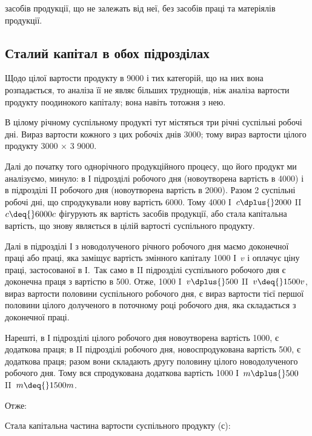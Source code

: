 \parcont{}  %
засобів продукції, що не залежать від неї, без засобів праці та матеріялів
продукції.

\subsection{Сталий капітал в обох підрозділах}

Щодо цілої вартости продукту в 9000 і тих категорій, що на них
вона розпадається, то аналіза її не являє більших труднощів, ніж аналіза
вартости продукту поодинокого капіталу; вона навіть тотожня з нею.

В цілому річному суспільному продукті тут містяться три річні суспільні
робочі дні. Вираз вартости кожного з цих робочіх днів \deq{} 3000; тому
вираз вартости цілого продукту 3000 × 3 \deq{} 9000.

Далі до початку того однорічного продукційного процесу, що його
продукт ми аналізуємо, минуло: в І підрозділі  робочого дня (новоутворена
вартість в 4000) і в підрозділі II  робочого дня (новоутворена
вартість в 2000). Разом 2 суспільні робочі дні, що спродукували
нову вартість \deq{} 6000. Тому 4000 І~$c \dplus{} 2000$ II~$c \deq{} 6000 c$ фігурують
як вартість засобів продукції, або стала капітальна вартість, що
знову являється в цілій вартості суспільного продукту.

Далі в підрозділі І з новодолученого річного робочого дня маємо 
доконечної праці або праці, яка заміщує вартість змінного капіталу 1000
І~$v$ і оплачує ціну праці, застосованої в І.~Так само в II підрозділі  суспільного
робочого дня є доконечна праця з вартістю в 500. Отже, 1000
I~$v \dplus{} 500$ II~$v \deq{} 1500 v$, вираз вартости половини суспільного робочого
дня, є вираз вартости тієї першої половини цілого долученого в поточному
році робочого дня, яка складається з доконечної праці.

Нарешті, в І підрозділі  цілого робочого дня новоутворена вартість \deq{}
1000, є додаткова праця; в II підрозділі  робочого дня, новоспродукована
вартість \deq{} 500, є додаткова праця; разом вони складають другу
половину цілого новодолученого робочого дня. Тому вся спродукована
додаткова вартість \deq{} 1000 І~$m \dplus{} 500$ II~$m \deq{} 1500 m$.

Отже:

Стала капітальна частина вартости суспільного продукту (с):

